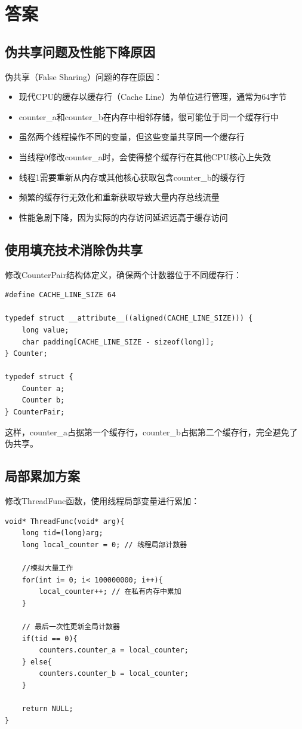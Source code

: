 \section{答案}
\subsection{伪共享问题及性能下降原因}

伪共享（False Sharing）问题的存在原因：
\begin{itemize}
    \item 现代CPU的缓存以缓存行（Cache Line）为单位进行管理，通常为64字节
    \item counter\_a和counter\_b在内存中相邻存储，很可能位于同一个缓存行中
    \item 虽然两个线程操作不同的变量，但这些变量共享同一个缓存行
    \item 当线程0修改counter\_a时，会使得整个缓存行在其他CPU核心上失效
    \item 线程1需要重新从内存或其他核心获取包含counter\_b的缓存行
    \item 频繁的缓存行无效化和重新获取导致大量内存总线流量
    \item 性能急剧下降，因为实际的内存访问延迟远高于缓存访问
\end{itemize}

\subsection{使用填充技术消除伪共享}

修改CounterPair结构体定义，确保两个计数器位于不同缓存行：

\begin{lstlisting}[style=cleancpp]
#define CACHE_LINE_SIZE 64

typedef struct __attribute__((aligned(CACHE_LINE_SIZE))) {
    long value;
    char padding[CACHE_LINE_SIZE - sizeof(long)];
} Counter;

typedef struct {
    Counter a;
    Counter b;
} CounterPair;
\end{lstlisting}

这样，counter\_a占据第一个缓存行，counter\_b占据第二个缓存行，完全避免了伪共享。

\subsection{局部累加方案}

修改ThreadFunc函数，使用线程局部变量进行累加：
\begin{lstlisting}[style=cleancpp]
void* ThreadFunc(void* arg){ 
    long tid=(long)arg; 
    long local_counter = 0; // 线程局部计数器
    
    //模拟大量工作 
    for(int i= 0; i< 100000000; i++){ 
        local_counter++; // 在私有内存中累加
    } 
    
    // 最后一次性更新全局计数器
    if(tid == 0){
        counters.counter_a = local_counter;
    } else{
        counters.counter_b = local_counter;
    }
    
    return NULL; 
}
\end{lstlisting}

